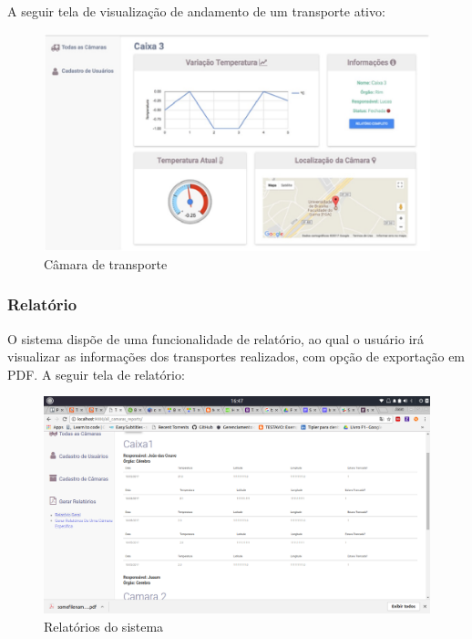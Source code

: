	A seguir tela de visualização de andamento de um transporte ativo:

\begin{figure}[H]
\centering
\includegraphics[width=16cm]{figuras/camara_software.jpg}
\caption{Câmara de transporte}
\end{figure}

\subsubsection{Relatório}
	O sistema dispõe de uma funcionalidade de relatório, ao qual o usuário irá visualizar as informações dos transportes realizados, com opção de exportação em PDF.
	A seguir tela de relatório:
\begin{figure}[H]
\centering
\includegraphics[width=16cm]{figuras/relatorio_software.png}
\caption{Relatórios do sistema}
\end{figure}

